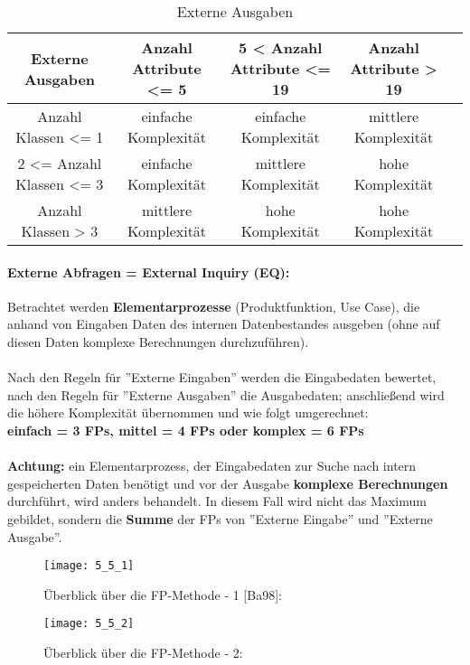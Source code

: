 \begin{table}
	\centering
	\begin{tabular}{||c | c | c | c | c ||} 
		\hline
		\textbf{Externe Ausgaben} & Anzahl Attribute <= 5 & 5 < Anzahl Attribute <= 19 & Anzahl Attribute > 19 \\  
		\hline\hline
		Anzahl Klassen <= 1 & einfache Komplexität & einfache Komplexität & mittlere Komplexität \\ 
		\hline
		2 <= Anzahl Klassen <= 3 & einfache Komplexität & mittlere Komplexität & hohe Komplexität \\ 
		\hline
		Anzahl Klassen > 3 & mittlere Komplexität & hohe Komplexität & hohe Komplexität \\ 
		\hline
	\end{tabular}
	\caption{Externe Ausgaben}
\end{table}

\paragraph{Externe Abfragen = External Inquiry (EQ):}
Betrachtet werden \textbf{Elementarprozesse} (Produktfunktion, Use Case), die anhand von Eingaben Daten des internen Datenbestandes ausgeben (ohne auf diesen Daten komplexe Berechnungen durchzuführen).
\\
\\
Nach den Regeln für ''Externe Eingaben'' werden die Eingabedaten bewertet, nach den Regeln für ''Externe Ausgaben'' die Ausgabedaten; anschließend wird die höhere Komplexität übernommen und wie folgt umgerechnet: \\
\textbf{einfach = 3 FPs, mittel = 4 FPs oder komplex = 6 FPs}
\\
\\
\textbf{Achtung:}  ein Elementarprozess, der Eingabedaten zur Suche nach intern gespeicherten Daten benötigt und vor der Ausgabe \textbf{komplexe Berechnungen} durchführt, wird anders behandelt. In diesem Fall wird nicht das Maximum gebildet, sondern die \textbf{Summe} der FPs von ''Externe Eingabe'' und ''Externe Ausgabe''.

\begin{figure}[h]
	\centering
	\caption{Überblick über die FP-Methode - 1 [Ba98]:}
	\texttt{[image: 5\_5\_1]}
\end{figure}

\begin{figure}[h]
\centering
\caption{Überblick über die FP-Methode - 2:}
\texttt{[image: 5\_5\_2]}
\end{figure}

